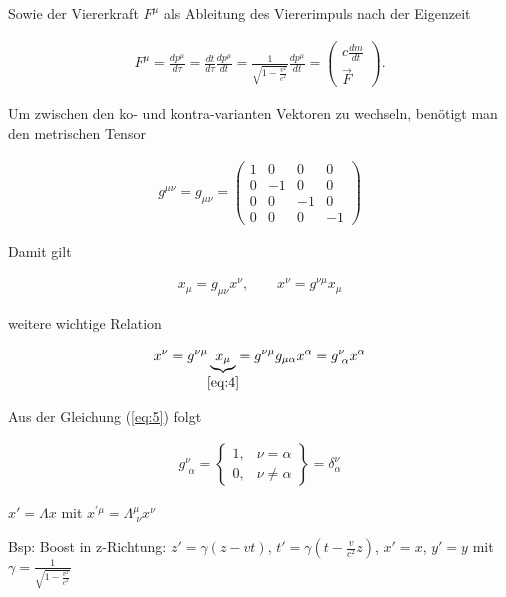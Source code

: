 Sowie der Viererkraft \(F^\mu\) als Ableitung des Viererimpuls nach der Eigenzeit

\begin{align}
  \label{eq:10}
  F^\mu = \frac{dp^\mu}{d\tau} = \frac{dt}{d\tau}\frac{dp^\mu}{dt} = \frac{1}{\sqrt{1-\frac{v^2}{c^2}}}\frac{dp^\mu}{dt} = \begin{pmatrix}c \frac{dm}{dt}\\\vec F \end{pmatrix}.
\end{align}


Um zwischen den ko- und kontra-varianten Vektoren zu wechseln, benötigt man den metrischen Tensor

\begin{align}
  \label{eq:3}
  g^{\mu\nu} = g_{\mu\nu} = \begin{pmatrix} 1&0&0&0 \\  0&-1&0&0 \\ 0&0&-1&0 \\ 0&0&0&-1  \end{pmatrix}
\end{align}


Damit gilt

\begin{align}
  \label{eq:4}
  x_{\mu} = g_{\mu\nu}x^\nu, \qquad x^\nu = g^{\nu\mu}x_\mu
\end{align}

weitere wichtige Relation

\begin{align}
  \label{eq:5}
  x^\nu = g^{\nu\mu}\underbr{x_\mu}_{\eqref{eq:4}} = g^{\nu\mu}  g_{\mu\alpha}x^\alpha = g^\nu_{\,\,\alpha}x^{\alpha}
\end{align}

Aus der Gleichung (\ref{eq:5}) folgt

\begin{align}
  \label{eq:6}
  g^\nu_{\,\,\alpha} = \begin{Bmatrix} 1,& \nu = \alpha\\ 0,&\nu\neq\alpha \end{Bmatrix} = \delta^\nu_{\alpha}
\end{align}




\(x' = \Lambda x\)  mit \(x^{'\mu}=\Lambda^\mu_{\,\, \nu}x^\nu\)

Bsp: Boost in z-Richtung: \(z' = \gamma(z-vt)\), \(t' = \gamma(t-\frac{v}{c^2}z)\), \(x' = x\), \(y'=y\) mit \(\gamma = \frac{1}{\sqrt{1-\frac{v^2}{c^2}}}\)

